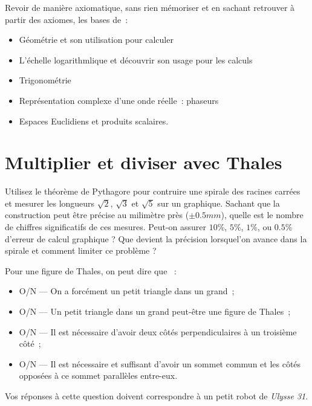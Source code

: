\begin{competences}
  Revoir de manière axiomatique, \cad{} sans rien mémoriser et en sachant retrouver à partir des axiomes, les bases de~:
  \begin{itemize}
  \item Géométrie et son utilisation pour calculer
  \item L'échelle logarithmlique et découvrir son usage pour les calculs
  \item Trigonométrie 
  \item Représentation complexe d'une onde réelle~: phaseurs
  \item Espaces Euclidiens et produits scalaires.
  \end{itemize}
  
\end{competences}

\section{Multiplier et diviser avec Thales}


Utilisez le théorème de Pythagore pour contruire une spirale des racines carrées et mesurer les longueurs $\sqrt{2}$, $\sqrt{3}$ et $\sqrt{5}$ sur un graphique. Sachant que
la construction peut être précise au milimètre près ($\pm 0.5mm$), quelle est le
nombre de chiffres significatifs de ces mesures.
Peut-on assurer $10\%$, $5\%$, $1\%$, ou $0.5\%$ d'erreur de calcul graphique ?
Que devient la précision lorsquel'on avance dans la spirale et comment limiter ce problème ?

Pour une figure de Thales, on peut dire que ~:
\begin{itemize}
\item O/N --- On a forcément un petit triangle dans un grand~;
\item O/N --- Un petit triangle dans un grand peut-être une figure de Thales~;
\item O/N --- Il est nécessaire d'avoir deux côtés perpendiculaires à un troisième côté~;
\item O/N --- Il est nécessaire et suffisant d'avoir un sommet commun et les côtés opposées à ce sommet parallèles entre-eux.
\end{itemize}

Vos réponses à cette question doivent correspondre à un petit robot de \emph{Ulysse 31}.

